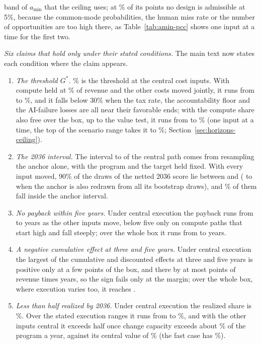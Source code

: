 band of $a_{\min}$ that the ceiling uses; at \StAminNoDesignShare\% of its points no design is admissible at 5\%, because the common-mode probabilities, the human miss rate or the number of opportunities are too high there, as Table~\ref{tab:amin-pcc} shows one input at a time for the first two.

\emph{Six claims that hold only under their stated conditions.} The main text now states each condition where the claim appears.
\begin{enumerate}[leftmargin=*,itemsep=1pt,topsep=2pt]
\item[ST-1.] \emph{The threshold $G^*$.} \GstarCenOne\% is the threshold at the central cost inputs. With compute held at \CcCen\% of revenue and the other costs moved jointly, it runs from \StGstarCcSixMin{} to \StGstarCcSixMax\%, and it falls below 30\% when the tax rate, the accountability floor and the AI-failure losses are all near their favorable ends; with the compute share also free over the box, up to the value test, it runs from \StGstarMin{} to \StGstarMax\% (one input at a time, the top of the scenario range takes it to \GstarCcHi\%; Section~\ref{sec:horizons-ceiling}).
\item[ST-2.] \emph{The 2036 interval.} The interval \CenRSixLo{} to \CenRSixHi{} of the central path comes from resampling the anchor alone, with the program and the target held fixed. With every input moved, 90\% of the draws of the netted 2036 score lie between \StNetSixPFive{} and \StNetSixPNinetyFive{} (\StNetSixBandLo{} to \StNetSixBandHi{} when the anchor is also redrawn from all its bootstrap draws), and \StNetSixInPaper\% of them fall inside the anchor interval.
\item[ST-3.] \emph{No payback within five years.} Under central execution the payback runs from \StPayCenMin{} to \StPayCenMax{} years as the other inputs move, below five only on compute paths that start high and fall steeply; over the whole box it runs from \StPayMin{} to \StPayMax{} years.
\item[ST-4.] \emph{A negative cumulative effect at three and five years.} Under central execution the largest of the cumulative and discounted effects at three and five years is positive only at a few points of the box, and there by at most \StCumMaxCen{} points of revenue times years, so the sign fails only at the margin; over the whole box, where execution varies too, it reaches \StCumMax.
\item[ST-5.] \emph{Less than half realized by 2036.} Under central execution the realized share is \PaceCenSix\%. Over the stated execution ranges it runs from \StRealMin{} to \StRealMax\%, and with the other inputs central it exceeds half once change capacity exceeds about \StCapHalf\% of the program a year, against its central value of \PaceCapCen\% (the fast case has \PaceCapFast\%).

\end{enumerate}
